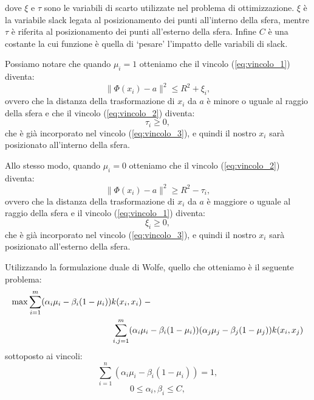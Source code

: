 \documentclass[a4paper,12pt]{report}
\begin{document}
\noindent dove $\xi$ e $\tau$ sono le variabili di scarto utilizzate nel problema di ottimizzazione. $\xi$ è la variabile slack legata al posizionamento dei punti all'interno della sfera, mentre $\tau$ è riferita al posizionamento dei punti all'esterno della sfera. Infine $C$ è una costante la cui funzione è quella di `pesare' l'impatto delle variabili di slack.

Possiamo notare che quando $\mu_i = 1$ otteniamo che il vincolo (\ref{eq:vincolo_1}) diventa:
\begin{equation*}
    \|\Phi(x_i)-a\|^{2} \le R^2 + \xi_i,
\end{equation*}
ovvero che la distanza della trasformazione di $x_i$ da $a$ è minore o uguale al raggio della sfera e che il vincolo (\ref{eq:vincolo_2}) diventa:
\begin{equation*}
    \tau_i \ge 0,
\end{equation*}
che è già incorporato nel vincolo (\ref{eq:vincolo_3}), e quindi il nostro $x_i$ sarà posizionato all'interno della sfera.

Allo stesso modo, quando $\mu_i = 0$ otteniamo che il vincolo (\ref{eq:vincolo_2}) diventa:
\begin{equation*}
    \|\Phi(x_i)-a\|^2 \ge R^2 - \tau_i,
\end{equation*}
ovvero che la distanza della trasformazione di $x_i$ da $a$ è maggiore o uguale al raggio della sfera e il vincolo (\ref{eq:vincolo_1}) diventa:
\begin{equation*}
    \xi_i \ge 0,
\end{equation*}
che è già incorporato nel vincolo (\ref{eq:vincolo_3}), e quindi il nostro $x_i$ sarà posizionato all'esterno della sfera.

Utilizzando la formulazione duale di Wolfe, quello che otteniamo è il seguente problema:
\begin{equation}
\begin{split}
    \max \displaystyle\sum_{i=1}^{m}(\alpha_i\mu_i - \beta_i(1-\mu_i))&k(x_i,x_i)\hspace{0,1cm}- \\ &\displaystyle\sum_{i,j=1}^{m}(\alpha_i\mu_i - \beta_i(1-\mu_i))(\alpha_j\mu_j - \beta_j(1-\mu_j))k(x_i,x_j)
\end{split}
\label{eq:problema_finale}
\end{equation}
sottoposto ai vincoli:
\begin{equation}
    \displaystyle\sum_{i=1}^{n}(\alpha_i\mu_i - \beta_i(1-\mu_i)) = 1,
    \label{eq:v1_problema_finale}
\end{equation}
\begin{equation}
    0 \le \alpha_i,\beta_i \le C,
    \label{eq:v2_problema_finale}
\end{equation}
\end{document}
